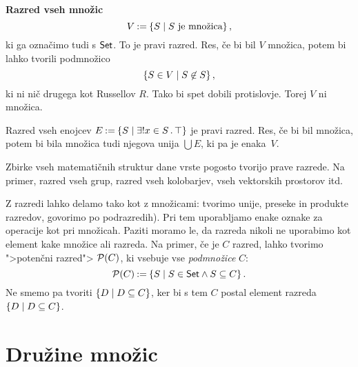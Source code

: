 \begin{zgled}
  \textbf{Razred vseh množic}
  \begin{equation*}
    V \mathbin{{:}{=}} \left\{ S \; \middle| \; \text{$S$ je množica} \right\},
  \end{equation*}
% 
  ki ga označimo tudi s $\mathsf{Set}$. To je pravi razred. Res, če bi bil $V$ množica,
  potem bi lahko tvorili podmnožico
  \begin{equation*}
    \left\{ S \in V \; \middle| \; S \not\in S\right\},
  \end{equation*}
  ki ni nič drugega kot Russellov $R$. Tako bi spet dobili protislovje. Torej $V$
  ni množica.
\end{zgled}

\begin{zgled}
  Razred vseh enojcev $E \mathbin{{:}{=}} \left\{ S \; \middle| \; \exists! x \in S \,.\, \top \right\}$ je pravi razred. Res, če bi bil množica, potem bi bila množica tudi njegova unija $\bigcup E$, ki pa je enaka~$V$.
\end{zgled}

\begin{zgled}
  Zbirke vseh matematičnih struktur dane vrste pogosto tvorijo prave razrede. Na primer, razred vseh grup, razred vseh kolobarjev, vseh vektorskih prostorov itd.
\end{zgled}

Z razredi lahko delamo tako kot z množicami: tvorimo unije, preseke in produkte
razredov, govorimo po podrazredih). Pri tem uporabljamo enake oznake za
operacije kot pri množicah. Paziti moramo le, da razreda nikoli ne uporabimo kot
element kake množice ali razreda. Na primer, če je $C$ razred, lahko tvorimo
">potenčni razred"> $\mathcal{P}(C)$, ki vsebuje vse \emph{podmnožice} $C$:
\begin{equation*}
    \mathcal{P}(C) \mathbin{{:}{=}} \left\{ S \; \middle| \; S \in \mathsf{Set} \land S \subseteq C \right\}.
\end{equation*}
%
Ne smemo pa tvoriti $\left\{ D \; \middle| \; D \subseteq C \right\}$, ker bi s tem $C$ postal element razreda $\left\{D \; \middle| \; D \subseteq C\right\}$.

\section{Družine množic}


